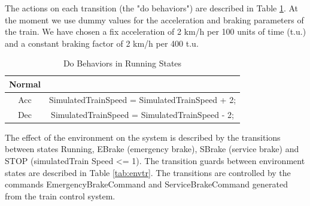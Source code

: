 The actions on each transition (the "do behaviors") are described in
Table \ref{tab:runningdo}. At the moment we use dummy values for the
acceleration and braking parameters of the train. We have chosen a fix
acceleration of 2 km/h per 100 units of time (t.u.) and a constant
braking factor of 2 km/h per 400 t.u.

\begin{table}[ht!]
\footnotesize
	\caption{Do Behaviors in Running States}
	\begin{center}
    \begin{tabular}{|c|c|}
	\hline    
    Normal & \\
	\hline    
    Acc & SimulatedTrainSpeed = SimulatedTrainSpeed + 2; \\
	\hline    
    Dec & SimulatedTrainSpeed = SimulatedTrainSpeed - 2;\\
	\hline
    \end{tabular}
    \end{center}
\label{tab:runningdo}
\end{table} 

The effect of the environment on the system is described by the
transitions between states Running, EBrake (emergency brake), SBrake
(service brake) and STOP (simulatedTrain Speed <= 1). The transition
guards between environment states are described in Table
\ref{tab:envtr}. The transitions are controlled by the commands
EmergencyBrakeCommand and ServiceBrakeCommand generated from the train
control system.

